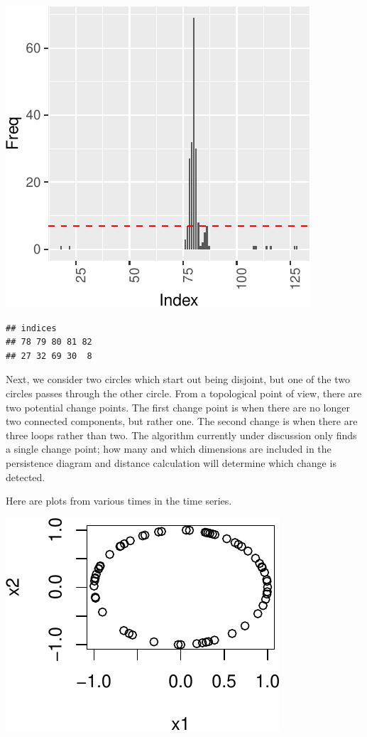 \documentclass[smallextended]{svjour3}       %
\begin{document}
\begin{center}\includegraphics{springer_template_files/figure-latex/unnamed-chunk-6-3} \end{center}

\begin{verbatim}
## indices
## 78 79 80 81 82 
## 27 32 69 30  8
\end{verbatim}

Next, we consider two circles which start out being disjoint, but one of
the two circles passes through the other circle. From a topological
point of view, there are two potential change points. The first change
point is when there are no longer two connected components, but rather
one. The second change is when there are three loops rather than two.
The algorithm currently under discussion only finds a single change
point; how many and which dimensions are included in the persistence
diagram and distance calculation will determine which change is
detected.

Here are plots from various times in the time series.

\begin{center}\includegraphics{springer_template_files/figure-latex/unnamed-chunk-7-1} \end{center}
\end{document}
